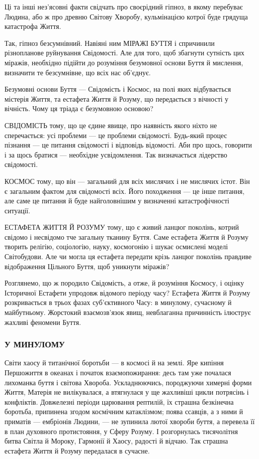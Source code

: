 Ці та інші нез’ясовні факти свідчать про своєрідний гіпноз, в якому перебуває
Людина, або ж про древню Світову Хворобу, кульмінацією котрої буде грядуща
катастрофа Життя.

Так, гіпноз безсумнівний. Навіяні ним МІРАЖІ БУТТЯ і спричинили різнопланове
руйнування Свідомості. Але для того, щоб збагнути сутність цих міражів,
необхідно підійти до розуміння безумовної основи Буття й мислення, визначити те
безсумнівне, що всіх нас об’єднує.

Безумовні основи Буття — Свідомість і Космос, на полі яких відбувається
містерія Життя, та естафета Життя й Розуму, що передається з вічності у
вічність. Чому ця тріада є безумовною основою?

СВІДОМІСТЬ тому, що це єдине явище, про наявність якого ніхто не сперечається:
усі проблеми — це проблеми свідомості. Будь-який процес пізнання — це питання
свідомості і відповідь відомості. Аби про щось, говорити і за щось братися —
необхідне усвідомлення. Так визначається лідерство свідомості.

КОСМОС тому, що він — загальний для всіх мислячих і не мислячих істот. Він є
загальним фактом для свідомості всіх. Його походження — це інше питання, але
саме це питання й буде найголовнішим у визначенні катастрофічності ситуації.

ЕСТАФЕТА ЖИТТЯ Й РОЗУМУ тому, що є живий ланцюг поколінь, котрий свідомо і
несвідомо тче загальну тканину Буття. Саме естафета Життя й Розуму творить
релігію, соціологію, науку, космогонію і шукає осмислені моделі Світобудови.
Але чи могла ця естафета передати крізь ланцюг поколінь правдиве відображення
Цільного Буття, щоб уникнути міражів?

Розглянемо, що ж породило Свідомість, а отже, й розуміння Космосу, і оцінку
Історичної Естафети упродовж відомого періоду часу? Естафета Життя й Розуму
розкривається в трьох фазах суб’єктивного Часу: в минулому, сучасному й
майбутньому. Жорстокий взаємозв’язок явищ, невблаганна причинність ілюструє
жахливі феномени Буття.

\subsubsection{У МИНУЛОМУ}

Світи хаосу й титанічної боротьби — в космосі й на землі. Яре кипіння
Першожиття в океанах і початок взаємопожирання: десь там уже почалася лихоманка
буття і світова Хвороба. Ускладнюючись, породжуючи химерні форми Життя, Матерія
не вилікувалася, а втягнулася у ще жахливіші цикли потрясінь і конфліктів.
Довжелезні періоди царювання рептилій, їх страшна безкінечна боротьба,
припинена згодом космічним катаклізмом; поява ссавців, а з ними й приматів —
ембріонів Людини, — не зупинила лютої хвороби буття, а перевела її в план
духовного протистояння, у Сферу Розуму. І розгорнулась тисячолітня битва Світла
й Мороку, Гармонії й Хаосу, радості й відчаю. Так страшна естафета Життя й
Розуму передалася в сучасне.

